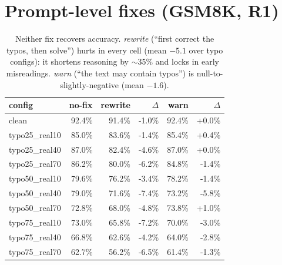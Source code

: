 \documentclass[11pt]{article}
\begin{document}
\section{Prompt-level fixes (GSM8K, R1)}
\begin{table}[h]\centering\small
\begin{tabular}{l r rr rr}
\toprule
config & no-fix & rewrite & $\Delta$ & warn & $\Delta$ \\
\midrule
clean & 92.4\% & 91.4\% & -1.0\% & 92.4\% & +0.0\% \\
typo25\_real10 & 85.0\% & 83.6\% & -1.4\% & 85.4\% & +0.4\% \\
typo25\_real40 & 87.0\% & 82.4\% & -4.6\% & 87.0\% & +0.0\% \\
typo25\_real70 & 86.2\% & 80.0\% & -6.2\% & 84.8\% & -1.4\% \\
typo50\_real10 & 79.6\% & 76.2\% & -3.4\% & 78.2\% & -1.4\% \\
typo50\_real40 & 79.0\% & 71.6\% & -7.4\% & 73.2\% & -5.8\% \\
typo50\_real70 & 72.8\% & 68.0\% & -4.8\% & 73.8\% & +1.0\% \\
typo75\_real10 & 73.0\% & 65.8\% & -7.2\% & 70.0\% & -3.0\% \\
typo75\_real40 & 66.8\% & 62.6\% & -4.2\% & 64.0\% & -2.8\% \\
typo75\_real70 & 62.7\% & 56.2\% & -6.5\% & 61.4\% & -1.3\% \\
\bottomrule
\end{tabular}
\caption{Neither fix recovers accuracy. \emph{rewrite} (``first correct the typos, then
solve'') hurts in every cell (mean $-5.1$ over typo configs): it shortens reasoning by
$\sim$35\% and locks in early misreadings. \emph{warn} (``the text may contain typos'')
is null-to-slightly-negative (mean $-1.6$).}
\end{table}
\end{document}
